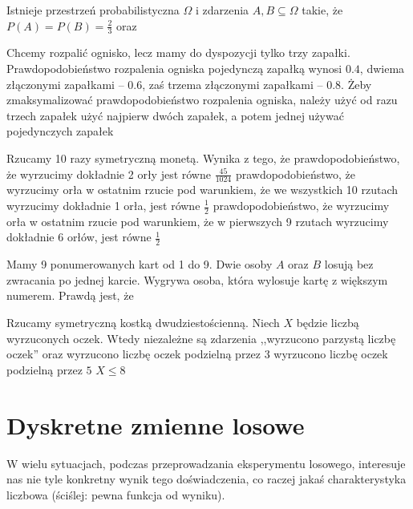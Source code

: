 \begin{problems}
    \prob Istnieje przestrzeń probabilistyczna $\Omega$ i zdarzenia $A,B\subseteq\Omega$ takie, że $P(A)=P(B)=\frac{2}{3}$ oraz

    \prob Chcemy rozpalić ognisko, lecz mamy do dyspozycji tylko trzy zapałki. Prawdopodobieństwo rozpalenia ogniska pojedynczą zapałką wynosi $0.4$, dwiema złączonymi zapałkami -- $0.6$, zaś trzema złączonymi zapałkami -- $0.8$. Żeby zmaksymalizować prawdopodobieństwo rozpalenia ogniska, należy
    \answers
    {użyć od razu trzech zapałek}
    {użyć najpierw dwóch zapałek, a potem jednej}
    {używać pojedynczych zapałek}

    \prob Rzucamy 10 razy symetryczną monetą. Wynika z tego, że
    \answers
    {prawdopodobieństwo, że wyrzucimy dokładnie 2 orły jest równe $\frac{45}{1024}$}
    {prawdopodobieństwo, że wyrzucimy orła w ostatnim rzucie pod warunkiem, że we wszystkich 10 rzutach wyrzucimy dokładnie 1 orła, jest równe $\frac{1}{2}$}
    {prawdopodobieństwo, że wyrzucimy orła w ostatnim rzucie pod warunkiem, że w pierwszych 9 rzutach wyrzucimy dokładnie 6 orłów, jest równe $\frac{1}{2}$}

    \prob Mamy 9 ponumerowanych kart od 1 do 9. Dwie osoby $A$ oraz $B$ losują bez zwracania po jednej karcie. Wygrywa osoba, która wylosuje kartę z większym numerem. Prawdą jest, że

    \prob Rzucamy symetryczną kostką dwudziestościenną. Niech $X$ będzie liczbą wyrzuconych oczek. Wtedy niezależne są zdarzenia ,,wyrzucono parzystą liczbę oczek'' oraz
    \answers
    {wyrzucono liczbę oczek podzielną przez $3$}
    {wyrzucono liczbę oczek podzielną przez $5$}
    {$X \leq 8$}
\end{problems}

\section{Dyskretne zmienne losowe}

W wielu sytuacjach, podczas przeprowadzania eksperymentu losowego, interesuje nas nie tyle konkretny wynik tego doświadczenia, co raczej jakaś charakterystyka liczbowa (ściślej: pewna funkcja od wyniku).

